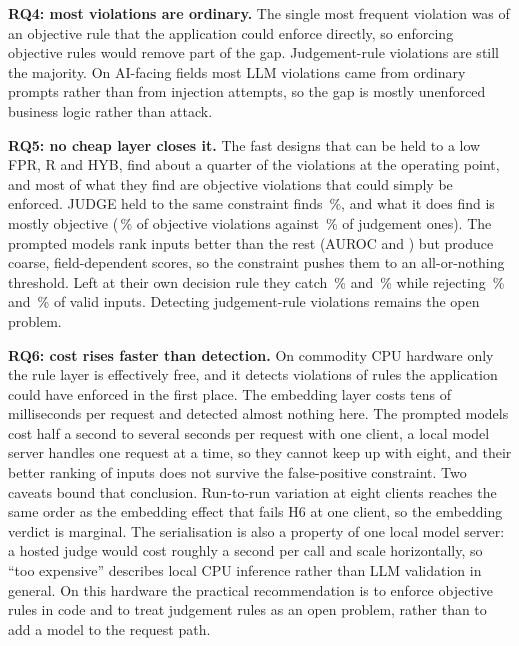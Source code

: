 \documentclass[conference]{IEEEtran}
\begin{document}
\textbf{RQ4: most violations are ordinary.} The single most frequent violation was of an objective rule
that the application could enforce directly, so enforcing objective rules would remove part of the gap.
Judgement-rule violations are still the majority. On AI-facing fields most LLM violations came from
ordinary prompts rather than from injection attempts, so the gap is mostly unenforced business logic
rather than attack.

\textbf{RQ5: no cheap layer closes it.} The fast designs that can be held to a low FPR, R and HYB, find
about a quarter of the violations at the operating point, and most of what they find are objective
violations that could simply be enforced. JUDGE held to the same constraint finds \,\%, and what it does find is mostly
objective (\,\% of objective violations against \,\% of judgement
ones). The prompted models rank inputs better than the rest (AUROC  and
) but produce coarse, field-dependent scores, so the constraint pushes them to an
all-or-nothing threshold. Left at their own decision rule they catch \,\% and
\,\% while rejecting \,\% and \,\% of valid
inputs. Detecting judgement-rule violations remains the open
problem.

\textbf{RQ6: cost rises faster than detection.} On commodity CPU hardware only the rule layer is
effectively free, and it detects violations of rules the application could have enforced in the first
place. The embedding layer costs tens of milliseconds per request and detected almost nothing here. The prompted models cost half a second to several seconds per request with one client, a local model
server handles one request at a time, so they cannot keep up with eight, and their better ranking of
inputs does not survive the false-positive constraint. Two caveats bound that conclusion. Run-to-run variation at eight clients reaches the same order as
the embedding effect that fails H6 at one client, so the embedding verdict is marginal. The
serialisation is also a property of one local model server: a hosted judge would cost roughly a second
per call and scale horizontally, so ``too expensive'' describes local CPU inference rather than LLM
validation in general. On this hardware the practical recommendation is to enforce objective rules in
code and to treat judgement rules as an open problem, rather than to add a model to the request
path.
\end{document}
